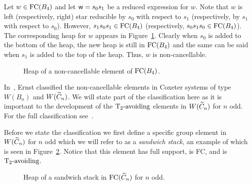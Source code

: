 \begin{example}
Let $w \in \mathrm{FC}(B_4)$ and let $\mathsf{w}=s_0s_1$ be a reduced expression for $w$. Note that $w$ is left (respectively, right) star reducible by $s_0$ with respect to $s_1$ (respectively, by $s_1$ with respect to $s_0$). However, $s_1s_0s_1 \in \mathrm{FC}(B_4)$ (respectively, $s_0s_1s_0 \in \mathrm{FC}(B_4)$).  The corresponding heap for $w$ appears in Figure~\ref{fig:noncancelvisual}. Clearly when $s_0$ is added to the bottom of the heap, the new heap is still in $\mathrm{FC}(B_4)$ and the same can be said when $s_1$ is added to the top of the heap. Thus, $w$ is non-cancellable.
\end{example}

\begin{figure*}[h!] \centering
{}	
\caption{Heap of a non-cancellable element of $\mathrm{FC}(B_4)$.}\label{fig:noncancelvisual}
\end{figure*}

In~\cite{Ernst2010}, Ernst classified the non-cancellable elements in Coxeter systems of type $W(B_n)$ and $W(\widetilde{C}_n)$. We will state part of the classification here as it is important to the development of the $\operatorname{T_2-\mathrm{avoiding}}$ elements in $W(\widetilde{C}_n)$ for $n$ odd. For the full classification see~\cite[Sections 4.2 and 5]{Ernst2010}. 

Before we state the classification we first define a specific group element in $W(\widetilde{C}_n)$ for $n$ odd which we will refer to as a \emph{sandwich stack}, an example of which is seen in Figure~\ref{fig:singsandstack}. Notice that this element has full support, is FC, and is $\operatorname{T_2-\mathrm{avoiding}}$.

\begin{figure}[h!] \centering
{}
\caption{Heap of a sandwich stack in $\mathrm{FC}(\widetilde{C}_n)$ for $n$ odd.}\label{fig:singsandstack}
\end{figure}

